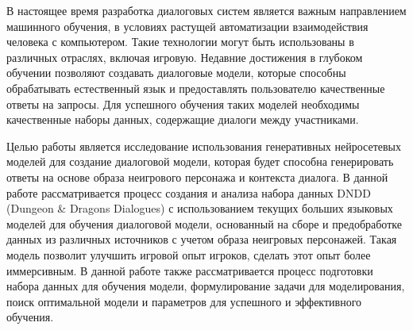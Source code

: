 В настоящее время разработка диалоговых систем является важным направлением машинного обучения, в условиях растущей автоматизации взаимодействия человека с компьютером. Такие технологии могут быть использованы в различных отраслях, включая игровую. Недавние достижения в глубоком обучении позволяют создавать диалоговые модели, которые способны обрабатывать естественный язык и предоставлять пользователю качественные ответы на запросы. Для успешного обучения таких моделей необходимы качественные наборы данных, содержащие диалоги между участниками. 

Целью работы является исследование использования генеративных нейросетевых моделей для создание диалоговой модели, которая будет способна генерировать ответы на основе образа неигрового персонажа и контекста диалога. В данной работе рассматривается процесс создания и анализа набора данных DNDD (Dungeon \& Dragons Dialogues) с использованием текущих больших языковых моделей для обучения диалоговой модели, основанный на сборе и предобработке данных из различных источников с учетом образа неигровых персонажей. Такая модель позволит улучшить игровой опыт игроков, сделать этот опыт более иммерсивным. В данной работе также рассматривается процесс подготовки набора данных для обучения модели, формулирование задачи для моделирования, поиск оптимальной модели и параметров для успешного и эффективного обучения.